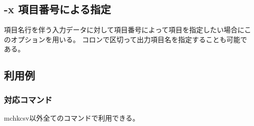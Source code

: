 

%

\subsection{-x 項目番号による指定\label{sect:option_x}}

項目名行を伴う入力データに対して項目番号によって項目を指定したい場合にこのオプションを用いる。
コロンで区切って出力項目名を指定することも可能である。

\subsection*{利用例}


\subsubsection*{対応コマンド}
mchkcsv以外全てのコマンドで利用できる。

%

